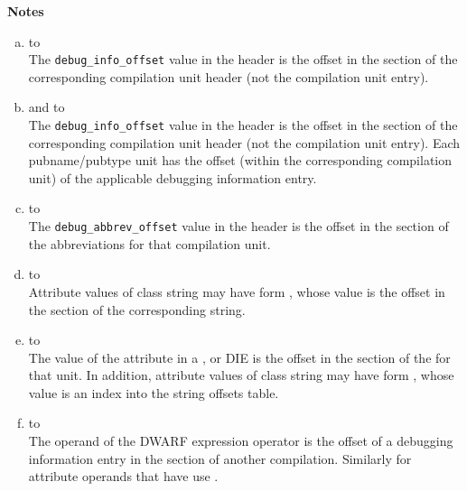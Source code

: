 \clearpage
\begin{center}
   \textbf{Notes}
\end{center}
\begin{enumerate}[(a)]  
\item  \dotdebugaranges{} to \dotdebuginfo \\
The \texttt{debug\_info\_offset} value in
the header is
the offset in the \dotdebuginfo{} section of the
corresponding compilation unit header (not the compilation
unit entry).

\item \dotdebugpubnames{} and \dotdebugpubtypes{} to \dotdebuginfo \\
The \texttt{debug\_info\_offset} value in the header is the offset in the
\dotdebuginfo{} section of the 
corresponding compilation unit header (not
the compilation unit entry). Each pubname/pubtype unit has the offset (within
the corresponding compilation unit) of the applicable debugging
information entry.

\item \dotdebuginfo{} to \dotdebugabbrev \\
The \texttt{debug\_abbrev\_offset} value in the header is the offset in the
\dotdebugabbrev{} 
section of the abbreviations for that compilation unit.

\item  \dotdebuginfo{} to \dotdebugstr \\
Attribute values of class string may have form 
\DWFORMstrp, whose
value is the offset in the \dotdebugstr{}
section of the corresponding string.

\item \dotdebugstroffsets{} to \dotdebugstroffsets \\
The value of the \DWATstroffsetsbase{} attribute in a
\DWTAGcompileunit{}, \DWTAGtypeunit{} or \DWTAGpartialunit{} 
DIE is the offset in the
\dotdebugstroffsets{} section of the 
for that unit.
In addition, attribute values of class string may have form 
\DWFORMstrx, whose value is an index into the
string offsets table.

\item \dotdebuginfo{} to \dotdebuginfo \\
The operand of the \DWOPcallref{} 
DWARF expression operator is the
offset of a debugging information entry in the 
\dotdebuginfo{} section of another compilation.
Similarly for attribute operands that have use
\DWFORMrefaddr.


\end{enumerate}
